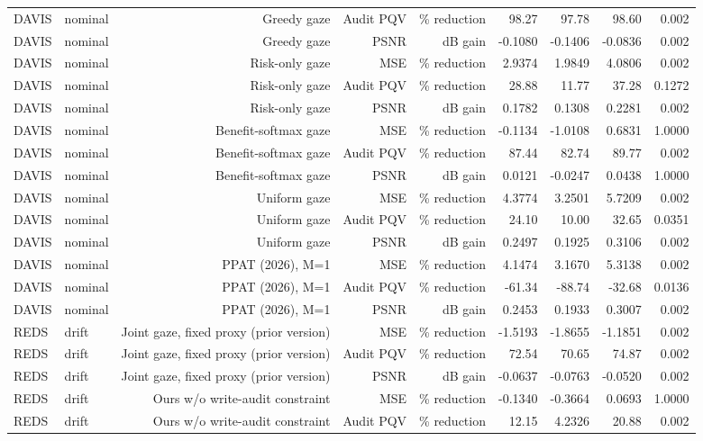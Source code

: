 \begin{table}[t]
\begin{tabular}{llrrrrrrr}
DAVIS & nominal & Greedy gaze & Audit PQV & \% reduction & 98.27 & 97.78 & 98.60 & 0.002 \\
DAVIS & nominal & Greedy gaze & PSNR & dB gain & -0.1080 & -0.1406 & -0.0836 & 0.002 \\
DAVIS & nominal & Risk-only gaze & MSE & \% reduction & 2.9374 & 1.9849 & 4.0806 & 0.002 \\
DAVIS & nominal & Risk-only gaze & Audit PQV & \% reduction & 28.88 & 11.77 & 37.28 & 0.1272 \\
DAVIS & nominal & Risk-only gaze & PSNR & dB gain & 0.1782 & 0.1308 & 0.2281 & 0.002 \\
DAVIS & nominal & Benefit-softmax gaze & MSE & \% reduction & -0.1134 & -1.0108 & 0.6831 & 1.0000 \\
DAVIS & nominal & Benefit-softmax gaze & Audit PQV & \% reduction & 87.44 & 82.74 & 89.77 & 0.002 \\
DAVIS & nominal & Benefit-softmax gaze & PSNR & dB gain & 0.0121 & -0.0247 & 0.0438 & 1.0000 \\
DAVIS & nominal & Uniform gaze & MSE & \% reduction & 4.3774 & 3.2501 & 5.7209 & 0.002 \\
DAVIS & nominal & Uniform gaze & Audit PQV & \% reduction & 24.10 & 10.00 & 32.65 & 0.0351 \\
DAVIS & nominal & Uniform gaze & PSNR & dB gain & 0.2497 & 0.1925 & 0.3106 & 0.002 \\
DAVIS & nominal & PPAT (2026), M=1 & MSE & \% reduction & 4.1474 & 3.1670 & 5.3138 & 0.002 \\
DAVIS & nominal & PPAT (2026), M=1 & Audit PQV & \% reduction & -61.34 & -88.74 & -32.68 & 0.0136 \\
DAVIS & nominal & PPAT (2026), M=1 & PSNR & dB gain & 0.2453 & 0.1933 & 0.3007 & 0.002 \\
REDS & drift & Joint gaze, fixed proxy (prior version) & MSE & \% reduction & -1.5193 & -1.8655 & -1.1851 & 0.002 \\
REDS & drift & Joint gaze, fixed proxy (prior version) & Audit PQV & \% reduction & 72.54 & 70.65 & 74.87 & 0.002 \\
REDS & drift & Joint gaze, fixed proxy (prior version) & PSNR & dB gain & -0.0637 & -0.0763 & -0.0520 & 0.002 \\
REDS & drift & Ours w/o write-audit constraint & MSE & \% reduction & -0.1340 & -0.3664 & 0.0693 & 1.0000 \\
REDS & drift & Ours w/o write-audit constraint & Audit PQV & \% reduction & 12.15 & 4.2326 & 20.88 & 0.002 \\

\end{tabular}
\end{table}
